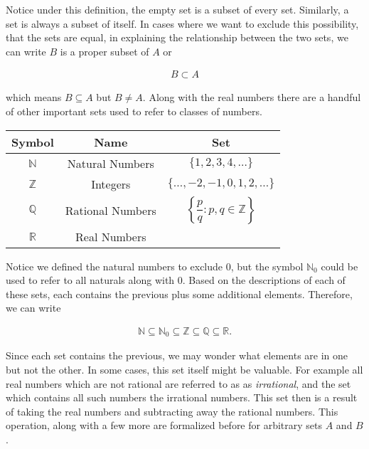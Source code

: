 Notice under this definition, the empty set is a subset of every set. Similarly, a set is always a subset of itself. In cases where we want to exclude this possibility, that the sets are equal, in explaining the relationship between the two sets, we can write $B$ is a proper subset of $A$ or 

\begin{align*}
	B \subset A
\end{align*}

which means $B \subseteq A$ but $B \neq A$. Along with the real numbers there are a handful of other important sets used to refer to classes of numbers.

\vspace{\baselineskip}
\begin{center}
	\begin{tabular}{ccc}
		\toprule
		Symbol & Name & Set \\
		\midrule
		$\mathbb{N}$ & Natural Numbers & $\{1, 2, 3, 4, \dots\}$ \\[10pt]
		$\mathbb{Z}$ & Integers & $\{\dots, -2, -1, 0, 1, 2, \dots\}$ \\[10pt]
		$\mathbb{Q}$ & Rational Numbers & $\left\{ \dfrac{p}{q} : p,q \in \mathbb{Z}\right\}$ \\[10pt]
		$\mathbb{R}$ & Real Numbers & \\
		\bottomrule
	\end{tabular}
\end{center}
\vspace{\baselineskip}

Notice we defined the natural numbers to exclude 0, but the symbol $\mathbb{N}_0$ could be used to refer to all naturals along with 0. Based on the descriptions of each of these sets, each contains the previous plus some additional elements. Therefore, we can write

\begin{align}
	\mathbb{N} \subseteq \mathbb{N}_0 \subseteq \mathbb{Z} \subseteq \mathbb{Q} \subseteq \mathbb{R}.
\end{align}

Since each set contains the previous, we may wonder what elements are in one but not the other. In some cases, this set itself might be valuable. For example all real numbers which are not rational are  referred to as as \emph{irrational}, and the set which contains all such numbers the irrational numbers. This set then is a result of taking the real numbers and subtracting away the rational numbers. This operation, along with a few more are formalized before for arbitrary sets $A$ and $B$.

